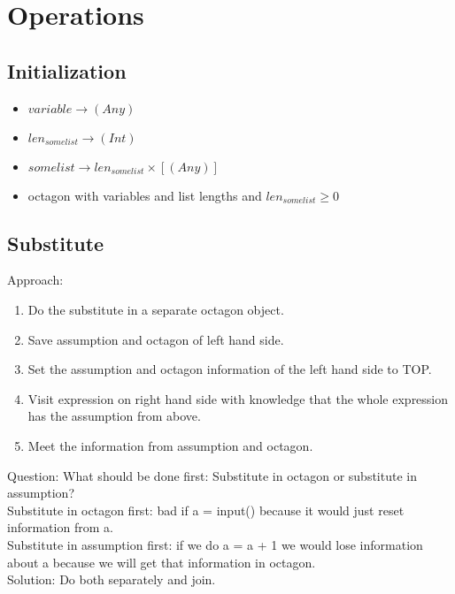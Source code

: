 \documentclass[11pt]{article}
\begin{document}
\section{Operations}

\subsection{Initialization}


\begin{itemize}
  \item $variable \rightarrow (Any)$
  \item $len_{somelist} \rightarrow (Int)$
  \item $somelist \rightarrow len_{somelist} \times [(Any)]$
  \item octagon with variables and list lengths and $len_{somelist} \geq 0$
\end{itemize}

\subsection{Substitute}

Approach:
\begin{enumerate}
  \item Do the substitute in a separate octagon object.
  \item Save assumption and octagon of left hand side.
  \item Set the assumption and octagon information of the left hand side to TOP.
  \item Visit expression on right hand side with knowledge that the whole expression has the assumption from above.
  \item Meet the information from assumption and octagon.
\end{enumerate}

Question: What should be done first: Substitute in octagon or substitute in assumption?\\
Substitute in octagon first: bad if a = input() because it would just reset information from a.\\
Substitute in assumption first: if we do a = a + 1 we would lose information about a because we will get that information in octagon.\\
Solution: Do both separately and join.
\end{document}
